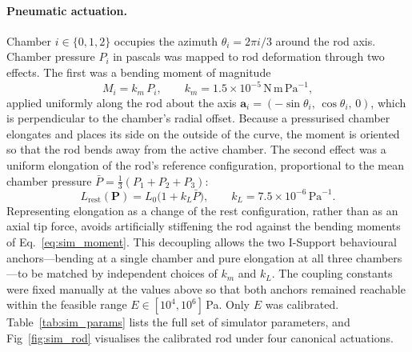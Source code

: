 \paragraph{Pneumatic actuation.}
Chamber $i \in \{0, 1, 2\}$ occupies the azimuth $\theta_i = 2 \pi i / 3$ around the rod axis. Chamber pressure $P_i$ in pascals was mapped to rod deformation through two effects. The first was a bending moment of magnitude
\begin{equation}
  M_i = k_m \, P_i, \qquad k_m = 1.5 \times 10^{-5}\,\mathrm{N\,m\,Pa}^{-1}, \label{eq:sim_moment}
\end{equation}
applied uniformly along the rod about the axis $\mathbf{a}_i = (-\sin\theta_i,\, \cos\theta_i,\, 0)$, which is perpendicular to the chamber's radial offset. Because a pressurised chamber elongates and places its side on the outside of the curve, the moment is oriented so that the rod bends away from the active chamber. The second effect was a uniform elongation of the rod's reference configuration, proportional to the mean chamber pressure $\bar{P} = \tfrac{1}{3}(P_1 + P_2 + P_3)$:
\begin{equation}
  L_{\mathrm{rest}}(\mathbf{P}) = L_0 \bigl( 1 + k_L \bar{P} \bigr), \qquad k_L = 7.5 \times 10^{-6}\,\mathrm{Pa}^{-1}. \label{eq:sim_stretch}
\end{equation}
Representing elongation as a change of the rest configuration, rather than as an axial tip force, avoids artificially stiffening the rod against the bending moments of Eq.~\eqref{eq:sim_moment}. This decoupling allows the two I-Support behavioural anchors---bending at a single chamber and pure elongation at all three chambers---to be matched by independent choices of $k_m$ and $k_L$. The coupling constants were fixed manually at the values above so that both anchors remained reachable within the feasible range $E \in [10^{4}, 10^{6}]$\,Pa. Only $E$ was calibrated. Table~\ref{tab:sim_params} lists the full set of simulator parameters, and Fig~\ref{fig:sim_rod} visualises the calibrated rod under four canonical actuations.


